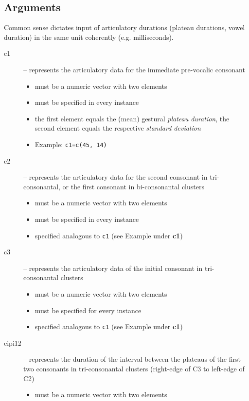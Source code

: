 \documentclass[
draft=false,
toc=graduated,
listof=totoc,
headsepline=true,
]%
{scrartcl}
\begin{document}
\subsection{Arguments}
Common sense dictates input of articulatory durations (plateau durations, vowel duration) in the same unit coherently (e.g. milliseconds). 
\begin{description}
\item[c1] -- represents the articulatory data for the immediate pre-vocalic consonant
\begin{itemize}
\item must be a numeric vector with two elements
\item must be specified in every instance
\item the first element equals the (mean) gestural \emph{plateau duration}, the second element equals the respective \emph{standard deviation}
\item Example: \texttt{c1=c(45, 14)}
\end{itemize}
\item[c2] -- represents the articulatory data for the second consonant in tri-consonantal, or the first consonant in bi-consonantal clusters
\begin{itemize}
\item must be a numeric vector with two elements
\item must be specified in every instance
\item specified analogous to \texttt{c1} (see Example under \textbf{c1})
\end{itemize}
\item[c3] -- represents the articulatory data of the initial consonant in tri-consonantal clusters
\begin{itemize}
\item must be a numeric vector with two elements
\item must be specified for every instance %
\item specified analogous to \texttt{c1} (see Example under \textbf{c1})
\end{itemize}
\item[cipi12] -- represents the duration of the interval between the plateaus of the first two consonants in tri-consonantal clusters (right-edge of C3 to left-edge of C2)
\begin{itemize}
\item must be a numeric vector with two elements

\end{itemize}
\end{description}
\end{document}
